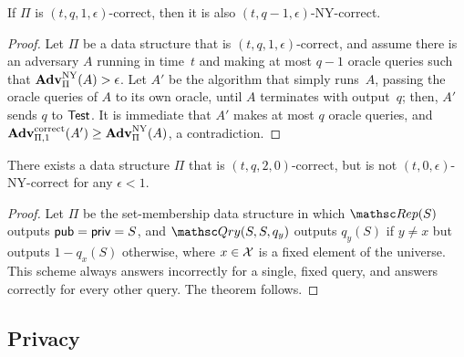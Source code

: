 \begin{theorem}
If $\Pi$ is $(t, q, 1, \epsilon)$-correct, then it is also $(t, q-1, \epsilon)$-NY-correct.
\end{theorem}

\begin{proof}
Let $\Pi$ be a data structure that is $(t,q,1,\epsilon)$-correct,
and assume
there is an adversary $A$ running in time~$t$
and making at most $q-1$ oracle queries such that
$\mathrm{\mathbf{Adv}}^{\mathrm{NY}}_{\Pi}(A) > \epsilon$.
Let $A'$ be the algorithm that simply
runs~$A$, passing the oracle queries of $A$ to its own oracle, until $A$ terminates
with output~$q$; then, $A'$ sends $q$ to $\mathsf{Test}$.  It is immediate that $A'$ makes at most $q$ oracle queries, and
$\mathrm{\mathbf{Adv}}^{\mathrm{correct}}_{\Pi,1}(A') \geq \mathrm{\mathbf{Adv}}^{\mathrm{NY}}_{\Pi}(A)$, a contradiction.
\end{proof}

\begin{theorem}
There exists a data structure $\Pi$ that
is $(t, q, 2, 0)$-correct, but is not $(t, 0, \epsilon)$-NY-correct
for any $\epsilon<1$.
\end{theorem}
\begin{proof}
Let $\Pi$ be the set-membership data structure in which $\Rep(S)$ outputs
${\sf pub}={\sf priv}=S$, and
$\Qry(S, S, q_y)$ outputs $q_y(S)$ if $y \neq x$ but outputs $1-q_x(S)$ otherwise,
where $x \in {\cal X}$ is a fixed element of the universe. This
scheme always answers incorrectly for a single, fixed query, and answers
correctly for every other query. The theorem follows.
\end{proof}

  


\newcommand{\leak}{{\sf leak}}
\subsection{Privacy}


